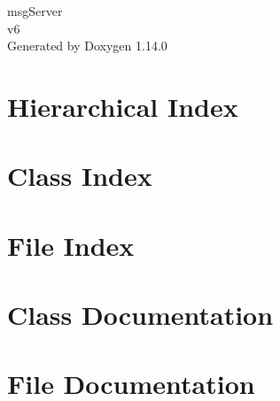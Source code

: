 \documentclass[twoside]{book}
\newcommand{\+}{\discretionary{\mbox{\scriptsize$\hookleftarrow$}}{}{}}
\newcommand{\clearemptydoublepage}{%
    \newpage{\pagestyle{empty}\cleardoublepage}%
  }
\begin{document}
  \raggedbottom
    \hypersetup{pageanchor=false,
                bookmarksnumbered=true,
                pdfencoding=unicode
               }
  \begin{titlepage}
  \vspace*{7cm}
  \begin{center}%
  {\Large msg\+Server}\\
  [1ex]\large v6 \\
  \vspace*{1cm}
  {\large Generated by Doxygen 1.14.0}\\
  \end{center}
  \end{titlepage}
  \clearemptydoublepage
  \tableofcontents
  \clearemptydoublepage
  \hypersetup{pageanchor=true}


\chapter{Hierarchical Index}

\chapter{Class Index}

\chapter{File Index}

\chapter{Class Documentation}




\chapter{File Documentation}










  \backmatter
  \newpage
  \clearemptydoublepage
  \printindex
\end{document}
